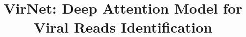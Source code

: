 \documentclass[conference]{IEEEtran}
\begin{document}
\title{\LARGE \bf VirNet: Deep Attention Model for Viral Reads Identification}



\end{document}
